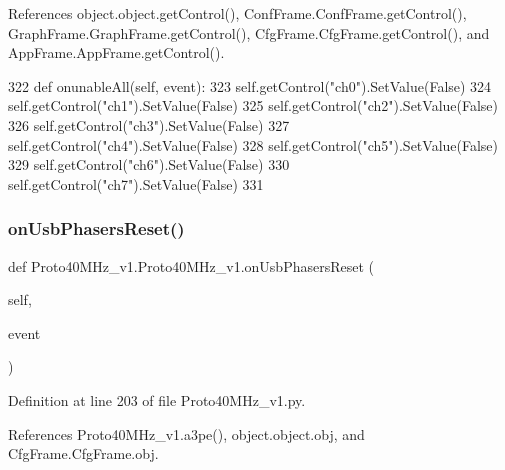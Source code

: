 References object.\+object.\+get\+Control(), Conf\+Frame.\+Conf\+Frame.\+get\+Control(), Graph\+Frame.\+Graph\+Frame.\+get\+Control(), Cfg\+Frame.\+Cfg\+Frame.\+get\+Control(), and App\+Frame.\+App\+Frame.\+get\+Control().


\begin{DoxyCode}
322     \textcolor{keyword}{def }onunableAll(self, event):
323         self.getControl(\textcolor{stringliteral}{"ch0"}).SetValue(\textcolor{keyword}{False})
324         self.getControl(\textcolor{stringliteral}{"ch1"}).SetValue(\textcolor{keyword}{False})
325         self.getControl(\textcolor{stringliteral}{"ch2"}).SetValue(\textcolor{keyword}{False})
326         self.getControl(\textcolor{stringliteral}{"ch3"}).SetValue(\textcolor{keyword}{False})
327         self.getControl(\textcolor{stringliteral}{"ch4"}).SetValue(\textcolor{keyword}{False})
328         self.getControl(\textcolor{stringliteral}{"ch5"}).SetValue(\textcolor{keyword}{False})
329         self.getControl(\textcolor{stringliteral}{"ch6"}).SetValue(\textcolor{keyword}{False})
330         self.getControl(\textcolor{stringliteral}{"ch7"}).SetValue(\textcolor{keyword}{False})
331 
\end{DoxyCode}
\mbox{\label{classProto40MHz__v1_1_1Proto40MHz__v1_af3de374ffd7881b77c2f8c8001a10077}} 
\subsubsection{\texorpdfstring{on\+Usb\+Phasers\+Reset()}{onUsbPhasersReset()}}
{\footnotesize\ttfamily def Proto40\+M\+Hz\+\_\+v1.\+Proto40\+M\+Hz\+\_\+v1.\+on\+Usb\+Phasers\+Reset (\begin{DoxyParamCaption}\item[{}]{self,  }\item[{}]{event }\end{DoxyParamCaption})}



Definition at line 203 of file Proto40\+M\+Hz\+\_\+v1.\+py.



References Proto40\+M\+Hz\+\_\+v1.\+a3pe(), object.\+object.\+obj, and Cfg\+Frame.\+Cfg\+Frame.\+obj.


